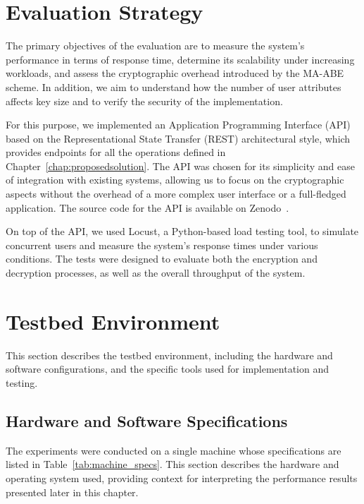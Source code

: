 \documentclass[cic,tc,english]{iiufrgs}
\numberwithin{algorithm}{chapter}
\begin{document}
    \section{Evaluation Strategy}
        \label{sec:evaluation-strategy}
        The primary objectives of the evaluation are to measure the system's performance in terms of response time, determine its scalability under increasing workloads, and assess the cryptographic overhead introduced by the MA-ABE scheme. In addition, we aim to understand how the number of user attributes affects key size and to verify the security of the implementation.

        For this purpose, we implemented an Application Programming Interface (API) based on the Representational State Transfer (REST) architectural style, which provides endpoints for all the operations defined in Chapter~\ref{chap:proposedsolution}. The API was chosen for its simplicity and ease of integration with existing systems, allowing us to focus on the cryptographic aspects without the overhead of a more complex user interface or a full-fledged application. The source code for the API is available on Zenodo~\citep{maabeflask}.

        On top of the API, we used Locust, a Python-based load testing tool, to simulate concurrent users and measure the system's response times under various conditions. The tests were designed to evaluate both the encryption and decryption processes, as well as the overall throughput of the system.

    \section{Testbed Environment}
        \label{sec:testbed}
        This section describes the testbed environment, including the hardware and software configurations, and the specific tools used for implementation and testing.

        \subsection{Hardware and Software Specifications}
        \label{subsec:hardware-software}
            The experiments were conducted on a single machine whose specifications are listed in Table~\ref{tab:machine_specs}. This section describes the hardware and operating system used, providing context for interpreting the performance results presented later in this chapter.
\end{document}
